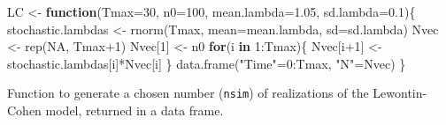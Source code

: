 \documentclass[
]{book}
\newenvironment{Shaded}{\begin{snugshade}}{\end{snugshade}}
\newcommand{\AttributeTok}[1]{\textcolor[rgb]{0.77,0.63,0.00}{#1}}
\newcommand{\ConstantTok}[1]{\textcolor[rgb]{0.00,0.00,0.00}{#1}}
\newcommand{\ControlFlowTok}[1]{\textcolor[rgb]{0.13,0.29,0.53}{\textbf{#1}}}
\newcommand{\DecValTok}[1]{\textcolor[rgb]{0.00,0.00,0.81}{#1}}
\newcommand{\FloatTok}[1]{\textcolor[rgb]{0.00,0.00,0.81}{#1}}
\newcommand{\FunctionTok}[1]{\textcolor[rgb]{0.00,0.00,0.00}{#1}}
\newcommand{\NormalTok}[1]{#1}
\newcommand{\OtherTok}[1]{\textcolor[rgb]{0.56,0.35,0.01}{#1}}
\newcommand{\SpecialCharTok}[1]{\textcolor[rgb]{0.00,0.00,0.00}{#1}}
\newcommand{\StringTok}[1]{\textcolor[rgb]{0.31,0.60,0.02}{#1}}
\begin{document}
\begin{Shaded}
\begin{Highlighting}[]
\NormalTok{LC }\OtherTok{\textless{}{-}} \ControlFlowTok{function}\NormalTok{(}\AttributeTok{Tmax=}\DecValTok{30}\NormalTok{, }\AttributeTok{n0=}\DecValTok{100}\NormalTok{, }\AttributeTok{mean.lambda=}\FloatTok{1.05}\NormalTok{, }\AttributeTok{sd.lambda=}\FloatTok{0.1}\NormalTok{)\{}
\NormalTok{  stochastic.lambdas }\OtherTok{\textless{}{-}} \FunctionTok{rnorm}\NormalTok{(Tmax, }\AttributeTok{mean=}\NormalTok{mean.lambda, }\AttributeTok{sd=}\NormalTok{sd.lambda)}
\NormalTok{  Nvec }\OtherTok{\textless{}{-}} \FunctionTok{rep}\NormalTok{(}\ConstantTok{NA}\NormalTok{, Tmax}\SpecialCharTok{+}\DecValTok{1}\NormalTok{)}
\NormalTok{  Nvec[}\DecValTok{1}\NormalTok{] }\OtherTok{\textless{}{-}}\NormalTok{ n0}
  \ControlFlowTok{for}\NormalTok{(i }\ControlFlowTok{in} \DecValTok{1}\SpecialCharTok{:}\NormalTok{Tmax)\{}
\NormalTok{    Nvec[i}\SpecialCharTok{+}\DecValTok{1}\NormalTok{] }\OtherTok{\textless{}{-}}\NormalTok{ stochastic.lambdas[i]}\SpecialCharTok{*}\NormalTok{Nvec[i]}
\NormalTok{  \}}
  \FunctionTok{data.frame}\NormalTok{(}\StringTok{"Time"}\OtherTok{=}\DecValTok{0}\SpecialCharTok{:}\NormalTok{Tmax, }\StringTok{"N"}\OtherTok{=}\NormalTok{Nvec)}
\NormalTok{\}}
\end{Highlighting}
\end{Shaded}

Function to generate a chosen number (\texttt{nsim}) of realizations of the Lewontin-Cohen model, returned in a data frame.
\end{document}
